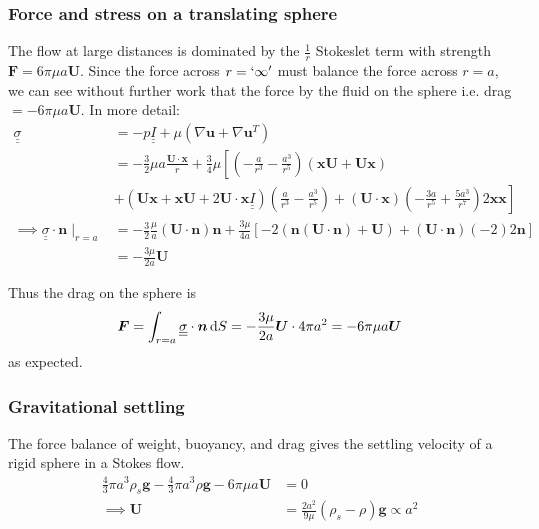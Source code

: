 \documentclass{jknotes}
\newcommand{\dunder}[1]{\underline{\underline{#1}}}
\newcommand{\x}{\bm{x}}
\newcommand{\inv}[1]{\frac{1}{#1}}
\begin{document}
\subsubsection{Force and stress on a translating sphere}
The flow at large distances is dominated by the $\inv{r}$ Stokeslet term with
strength $\bm{F} = 6\pi \mu a \bm{U}$. Since the force across $r = `\infty'$
must balance the force across $r=a$, we can see without further work that the
force by the fluid on the sphere i.e. drag $=-6\pi \mu a \bm{U}$. In more
detail:
\begin{align}
	\dunder{\sigma} &= -p \dunder{I} + \mu \left( \nabla \bm{u} + \nabla
	\bm{u}^T\right) \\
	&= -\frac{3}{2} \mu a \frac{\bm{U}\cdot\x}{r} + \frac{3}{4}\mu \left[
	\left(-\frac{a}{r^3} - \frac{a^3}{r^5}\right)\left(\x \bm{U} + \bm{U}
		\x\right)\right. \\
		&+ \left.\left(\bm{U}\x + \x \bm{U} + 2\bm{U}\cdot\x
		\dunder{I}\right)\left(\frac{a}{r^3} - \frac{a^3}{r^5}\right) +
	\left(\bm{U}\cdot\x\right)\left(-\frac{3a}{r^5}+\frac{5a^3}{r^7}\right)2\x\x\right]
	\\
	\implies\dunder{\sigma}\cdot\bm{n}\mid_{r=a} &= -\frac{3}{2}\frac{\mu}{a}
	(\bm{U}\cdot\bm{n})\bm{n} + \frac{3\mu}{4a}
	\left[-2(\bm{n}(\bm{U}\cdot\bm{n}) + \bm{U}) +
	(\bm{U}\cdot\bm{n})(-2)2\bm{n}\right] \\
	&= -\frac{3\mu}{2a}\bm{U}
\end{align}

Thus the drag on the sphere is
\begin{equation}
	\bm{F} = \int_{r=a} \dunder{\sigma}\cdot \bm{n}\,\diffd S =
	-\frac{3\mu}{2a} \bm{U} \cdot 4\pi a^2 = -6\pi \mu a \bm{U}
\end{equation}
as expected.

\subsubsection{Gravitational settling}
The force balance of weight, buoyancy, and drag gives the settling velocity of
a rigid sphere in a Stokes flow.
\begin{align}
	\frac{4}{3}\pi a^3 \rho_s \bm{g} - \frac{4}{3}\pi a^3 \rho \bm{g} - 6\pi
	\mu a \bm{U} &= 0 \\
	\implies \bm{U} &= \frac{2a^2}{9\mu}(\rho_s - \rho)\bm{g} \propto a^2
\end{align}
\end{document}
